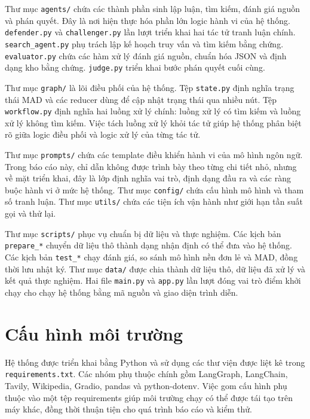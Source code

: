 ﻿\documentclass[oneside,a4paper,12pt]{extreport}
\begin{document}
Thư mục \texttt{agents/} chứa các thành phần sinh lập luận, tìm kiếm, đánh giá nguồn và phán quyết. Đây là nơi hiện thực hóa phần lớn logic hành vi của hệ thống. \texttt{defender.py} và \texttt{challenger.py} lần lượt triển khai hai tác tử tranh luận chính. \texttt{search\_agent.py} phụ trách lập kế hoạch truy vấn và tìm kiếm bằng chứng. \texttt{evaluator.py} chứa các hàm xử lý đánh giá nguồn, chuẩn hóa JSON và định dạng kho bằng chứng. \texttt{judge.py} triển khai bước phán quyết cuối cùng.

Thư mục \texttt{graph/} là lõi điều phối của hệ thống. Tệp \texttt{state.py} định nghĩa trạng thái MAD và các reducer dùng để cập nhật trạng thái qua nhiều nút. Tệp \texttt{workflow.py} định nghĩa hai luồng xử lý chính: luồng xử lý có tìm kiếm và luồng xử lý không tìm kiếm. Việc tách luồng xử lý khỏi tác tử giúp hệ thống phân biệt rõ giữa logic điều phối và logic xử lý của từng tác tử.

Thư mục \texttt{prompts/} chứa các template điều khiển hành vi của mô hình ngôn ngữ. Trong báo cáo này, chỉ dẫn không được trình bày theo từng chi tiết nhỏ, nhưng về mặt triển khai, đây là lớp định nghĩa vai trò, định dạng đầu ra và các ràng buộc hành vi ở mức hệ thống. Thư mục \texttt{config/} chứa cấu hình mô hình và tham số tranh luận. Thư mục \texttt{utils/} chứa các tiện ích vận hành như giới hạn tần suất gọi và thử lại.

Thư mục \texttt{scripts/} phục vụ chuẩn bị dữ liệu và thực nghiệm. Các kịch bản \texttt{prepare\_*} chuyển dữ liệu thô thành dạng nhận định có thể đưa vào hệ thống. Các kịch bản \texttt{test\_*} chạy đánh giá, so sánh mô hình nền đơn lẻ và MAD, đồng thời lưu nhật ký. Thư mục \texttt{data/} được chia thành dữ liệu thô, dữ liệu đã xử lý và kết quả thực nghiệm. Hai file \texttt{main.py} và \texttt{app.py} lần lượt đóng vai trò điểm khởi chạy cho chạy hệ thống bằng mã nguồn và giao diện trình diễn.

\section{Cấu hình môi trường}

Hệ thống được triển khai bằng Python và sử dụng các thư viện được liệt kê trong \texttt{requirements.txt}. Các nhóm phụ thuộc chính gồm LangGraph, LangChain, Tavily, Wikipedia, Gradio, pandas và python-dotenv. Việc gom cấu hình phụ thuộc vào một tệp requirements giúp môi trường chạy có thể được tái tạo trên máy khác, đồng thời thuận tiện cho quá trình báo cáo và kiểm thử.
\end{document}
